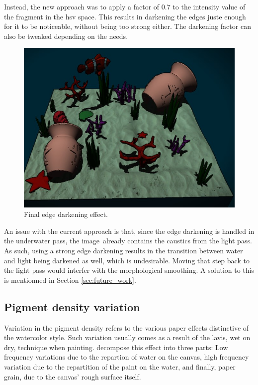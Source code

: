 \documentclass{article}
\begin{document}
\noindent
Instead, the new approach was to apply a factor of 0.7 to the intensity value of the fragment in the hsv space.
This results in darkening the edges juste enough for it to be noticeable, without being too strong either. 
The darkening factor can also be tweaked depending on the needs.

\begin{figure}[h]
    \centering
    \includegraphics[width=.8\columnwidth]{imgs/post_edge_darkening.jpg}
    \caption{Final edge darkening effect.}
    \label{fig:post_edge_darkening}
\end{figure}
\vspace{-1em}

\noindent
An issue with the current approach is that, since the edge darkening is handled in the underwater pass,
the image~already contains the caustics from the light pass. As such, using a strong edge darkening results 
in the transition between water and light being darkened as well, which is undesirable. Moving that step back 
to the light pass would interfer with the morphological smoothing. 
A solution to this is mentionned in Section \ref{sec:future_work}.

\subsection{Pigment density variation}

Variation in the pigment density refers to the various paper effects distinctive of the watercolor style. 
Such variation usually comes as a result of the lavis, wet on dry, technique when painting. 
\cite{watercolor_paper} decompose this effect into three parts: Low frequency variations due to the repartion
of water on the canvas, high frequency variation due to the repartition of the paint on the water, and finally,
paper grain, due to the canvas' rough surface itself.
\end{document}
